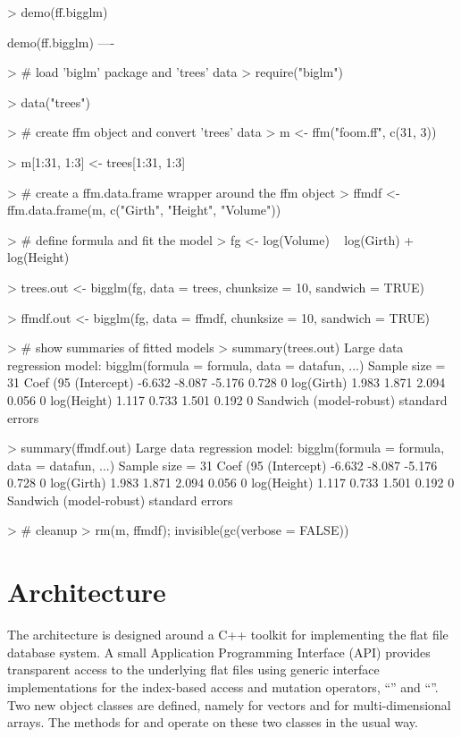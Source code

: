 \documentclass[12pt,a4paper]{article}
\begin{document}
\begin{small}
\begin{Schunk}
\begin{Sinput}
> demo(ff.bigglm)
\end{Sinput}
\begin{Soutput}
	demo(ff.bigglm)
	---- ~~~~~~~~~

> # load 'biglm' package and 'trees' data
> require("biglm")

> data("trees")

> # create ffm object and convert 'trees' data
> m <- ffm("foom.ff", c(31, 3))

> m[1:31, 1:3] <- trees[1:31, 1:3]

> # create a ffm.data.frame wrapper around the ffm object
> ffmdf <- ffm.data.frame(m, c("Girth", "Height", "Volume"))

> # define formula and fit the model 
> fg        <- log(Volume) ~ log(Girth) + log(Height)

> trees.out <- bigglm(fg, data = trees, chunksize = 10, sandwich = TRUE)  

> ffmdf.out <- bigglm(fg, data = ffmdf, chunksize = 10, sandwich = TRUE)

> # show summaries of fitted models
> summary(trees.out)  
Large data regression model: bigglm(formula = formula, data = datafun, ...)
Sample size =  31 
              Coef   (95%
(Intercept) -6.632 -8.087 -5.176 0.728 0
log(Girth)   1.983  1.871  2.094 0.056 0
log(Height)  1.117  0.733  1.501 0.192 0
Sandwich (model-robust) standard errors

> summary(ffmdf.out)  
Large data regression model: bigglm(formula = formula, data = datafun, ...)
Sample size =  31 
              Coef   (95%
(Intercept) -6.632 -8.087 -5.176 0.728 0
log(Girth)   1.983  1.871  2.094 0.056 0
log(Height)  1.117  0.733  1.501 0.192 0
Sandwich (model-robust) standard errors

> # cleanup
> rm(m, ffmdf); invisible(gc(verbose = FALSE))
\end{Soutput}
\end{Schunk}
\end{small}


\section{Architecture}

The  architecture is designed around a C++ toolkit for implementing the flat file database system.
A small \R{} Application Programming Interface (API) provides transparent access to the underlying flat files using
generic interface implementations for the index-based access and mutation operators, ``\rc{[\,]}'' and ``\rc{[\,]<-}''.
Two new object classes are defined, namely  for vectors and  for multi-dimensional arrays.   
The methods for  and  operate on these two classes in the usual way.
\end{document}
